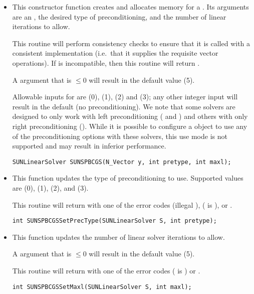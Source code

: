 \begin{itemize}


\item {}

  This constructor function creates and allocates memory for a {\spbcg}
  .  Its arguments are an {\nvector}, the desired
  type of preconditioning, and the number of linear iterations to allow.

  This routine will perform consistency checks to ensure that it is
  called with a consistent {\nvector} implementation (i.e.~that it
  supplies the requisite vector operations).  If  is
  incompatible, then this routine will return .

  A  argument that is $\le0$ will result in the default
  value (5).

  Allowable inputs for  are  (0),
   (1),  (2) and  (3);
  any other integer input will result in the default (no
  preconditioning).
  We note that some {\sundials} solvers are designed to only work
  with left preconditioning ({\ida} and {\idas}) and others with only
  right preconditioning ({\kinsol}). While it is possible to configure
  a {\sunlinsolspgmr} object to use any of the preconditioning options
  with these solvers, this use mode is not supported and may result in
  inferior performance.

  \verb|SUNLinearSolver SUNSPBCGS(N_Vector y, int pretype, int maxl);|


\item {}

  This function updates the type of preconditioning to use.  Supported
  values are  (0),  (1),
   (2), and  (3).  

  This routine will return with one of the error codes
   (illegal ), 
  ( is ), or .
  
  \verb|int SUNSPBCGSSetPrecType(SUNLinearSolver S, int pretype);|


\item {}

  This function updates the number of linear solver iterations to allow.  

  A  argument that is $\le0$ will result in the default
  value (5).

  This routine will return with one of the error codes
   ( is ) or .
  
  \verb|int SUNSPBCGSSetMaxl(SUNLinearSolver S, int maxl);|

\end{itemize}
